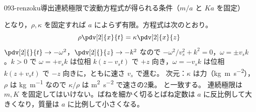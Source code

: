 \documentclass[uplatex,dvipdfmx,a4paper,11pt]{jsarticle}
\begin{document}
\begin{mondai}{093-renzoku}{導出}{連続極限で波動方程式が得られる条件（$m/a$ と $Ka$ を固定）}
\begin{tadashii}
となり，$\rho,\kappa$ を固定すれば $a$ によらず有限。方程式は次のとおり。
\[ \rho\pdv[2]{x}{t}=\kappa\pdv[2]{x}{z} \]
 $\pdv[2]{}{t}\to-\omega^{2}$，$\pdv[2]{}{z}\to-k^{2}$ なので $-\omega^{2}/v_s^{2}+k^{2}=0$，$\omega=\pm v_sk$。$k>0$ で $\omega=+v_sk$ は位相 $k(z-v_st)$ で $+z$ 向き，$\omega=-v_sk$ は位相 $k(z+v_st)$ で $-z$ 向きに，ともに速さ $v_s$ で進む。
\kenzan 次元：$\kappa$ は力（\unit{\kilogram\metre\per\second\squared}），$\rho$ は \unit{\kilogram\per\metre} なので $\kappa/\rho$ は \unit{\metre\squared\per\second\squared} で速さの2乗。 と一致する。
\tsumazuki 連続極限は $m,K$ を固定してはいけない。ばねを細かく切るとばね定数は $a$ に反比例して大きくなり，質量は $a$ に比例して小さくなる。
\end{tadashii}
\end{mondai}
\end{document}
